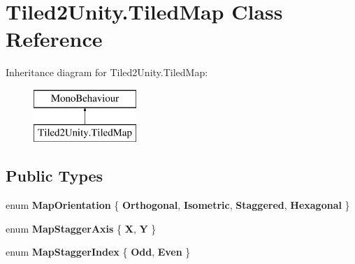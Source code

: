 \hypertarget{class_tiled2_unity_1_1_tiled_map}{}\section{Tiled2\+Unity.\+Tiled\+Map Class Reference}
\label{class_tiled2_unity_1_1_tiled_map}
Inheritance diagram for Tiled2\+Unity.\+Tiled\+Map\+:\begin{figure}[H]
\begin{center}
\leavevmode
\includegraphics[height=2.000000cm]{class_tiled2_unity_1_1_tiled_map}
\end{center}
\end{figure}
\subsection*{Public Types}
\begin{DoxyCompactItemize}
\item 
\mbox{\label{class_tiled2_unity_1_1_tiled_map_a10fd626f5ab8d58e41c50d30829d28c3}} 
enum {\bfseries Map\+Orientation} \{ {\bfseries Orthogonal}, 
{\bfseries Isometric}, 
{\bfseries Staggered}, 
{\bfseries Hexagonal}
 \}
\item 
\mbox{\label{class_tiled2_unity_1_1_tiled_map_ad518b3edd3ec47ca251249cb096c0a8d}} 
enum {\bfseries Map\+Stagger\+Axis} \{ {\bfseries X}, 
{\bfseries Y}
 \}
\item 
\mbox{\label{class_tiled2_unity_1_1_tiled_map_a18de2ab433a61d0e6e40117e0a2f0fd7}} 
enum {\bfseries Map\+Stagger\+Index} \{ {\bfseries Odd}, 
{\bfseries Even}
 \}
\end{DoxyCompactItemize}
